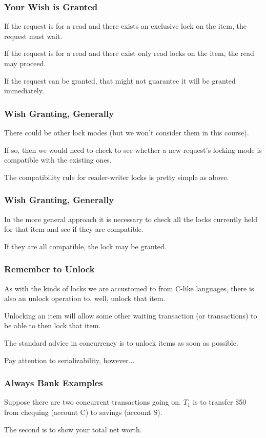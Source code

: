 \begin{frame}
\frametitle{Your Wish is Granted}


If the request is for a read and there exists an exclusive lock on the item, the request must wait. 

If the request is for a read and there exist only read locks on the item, the read may proceed. 

If the request can be granted, that might not guarantee it will be granted immediately.


\end{frame}

\begin{frame}
\frametitle{Wish Granting, Generally}

There could be other lock modes (but we won't consider them in this course).

If so, then we would need to check to see whether a new request's locking mode is compatible with the existing ones. 

The compatibility rule for reader-writer locks is pretty simple as above. 


\end{frame}

\begin{frame}
\frametitle{Wish Granting, Generally}

In the more general approach it is necessary to check all the locks currently held for that item and see if they are compatible. 

If they are all compatible, the lock may be granted.


\end{frame}

\begin{frame}
\frametitle{Remember to Unlock}

As with the kinds of locks we are accustomed to from C-like languages, there is also an unlock operation to, well, unlock that item. 

Unlocking an item will allow some other waiting transaction (or transactions) to be able to then lock that item.

The standard advice in concurrency is to unlock items as soon as possible.

Pay attention to serializability, however...

\end{frame}

\begin{frame}[fragile]
\frametitle{Always Bank Examples}

Suppose there are two concurrent transactions going on. $T_{1}$ is to transfer \$50 from chequing (account C) to savings (account S). 

The second is to show your total net worth.

\end{frame}

